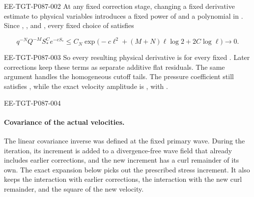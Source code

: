 \begin{EESegment}{EE-TGT-P087-002}
At any fixed correction stage, changing a fixed derivative estimate to physical variables introduces
a fixed power of  and a polynomial in
. Since ,
, and , every fixed choice of
 satisfies
\end{EESegment}
\[
  q^{-N}Q^{-M}S_*^C e^{-cS_*}
  \leq C_N\exp\bigl(-c\ell^2+(M+N)\ell\log 2+2C\log\ell\bigr)
  \longrightarrow 0.
\]
\begin{EESegment}{EE-TGT-P087-003}
So every resulting physical derivative is  for every fixed
. Later corrections keep these terms as separate additive flat residuals.
The same argument handles the homogeneous cutoff tails. The pressure coefficient still satisfies
, while the exact velocity amplitude
is , with
.
\end{EESegment}

\begin{EESegment}{EE-TGT-P087-004}
\paragraph{Covariance of the actual velocities.}
The linear covariance inverse was defined at the fixed primary wave. During the iteration, its
increment is added to a divergence-free wave field that already includes earlier corrections, and the
new increment has a curl remainder of its own. The exact expansion below picks out the prescribed
stress increment. It also keeps the interaction with earlier corrections, the interaction with the
new curl remainder, and the square of the new velocity.
\end{EESegment}

